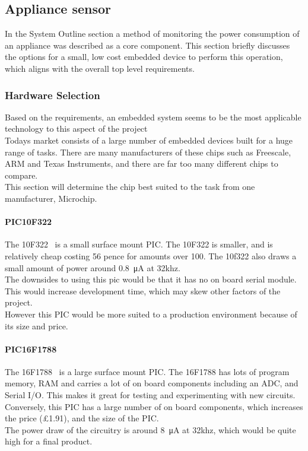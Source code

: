 \documentclass[preprint,12pt,3p]{elsarticle}
\begin{document}
\clearpage
\subsection{Appliance sensor}
In the System Outline section a method of monitoring the power consumption of an appliance was described as a core component. This section briefly discusses the options for a small, low cost embedded device to perform this operation, which aligns with the overall top level requirements.

\subsubsection{Hardware Selection}
Based on the requirements, an embedded system seems to be the most applicable technology to this aspect of the project\\
Todays market consists of a large number of embedded devices built for a huge range of tasks. There are many manufacturers of these chips such as Freescale, ARM and Texas Instruments, and there are far too many different chips to compare.\\
This section will determine the chip best suited to the task from one manufacturer, Microchip.

\paragraph{PIC10F322}
The 10F322~\cite{10f322} is a small surface mount PIC. The 10F322 is smaller, and is relatively cheap costing 56 pence for amounts over 100.
The 10f322 also draws a small amount of power around \SI{0.8}{\micro\ampere} at 32khz.\\
The downsides to using this pic would be that it has no on board serial module. This would increase development time, which may skew other factors of the project.\\
However this PIC would be more suited to a production environment because of its size and price.

\paragraph{PIC16F1788}
The 16F1788~\cite{16f1788} is a large surface mount PIC. The 16F1788 has lots of program memory, RAM  and carries a lot of on board components including an ADC, and Serial I/O. This makes it great for testing and experimenting with new circuits.\\
Conversely, this PIC has a large number of on board components, which increases the price (\pounds1.91),  and the size of the PIC.\\
The power draw of the circuitry is around \SI{8}{\micro\ampere} at 32khz, which would be quite high for a final product.
\end{document}
